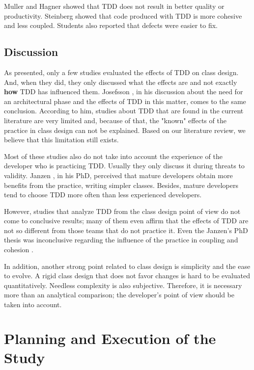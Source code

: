 \documentclass[times]{elsarticle}
\begin{document}
Muller and Hagner \cite{muller-e-hagner} showed that TDD does not result in
better quality or productivity. Steinberg \cite{steinberg} showed that
code produced with TDD is more cohesive and less coupled. Students also reported
that defects were easier to fix.

\subsection{Discussion}

As presented, only a few studies evaluated the effects of TDD on class design.
And, when they did, they only discussed what the effects are and not exactly
\textbf{how} TDD has influenced them. Josefsson \cite{josefsson}, in his discussion
about the need for an architectural phase and the effects of TDD in this matter,
comes to the same conclusion. According to him, studies about TDD that are
found in the current literature are very limited and, because of that, the
"known" effects of the practice in class design can not be explained. Based on
our literature review, we believe that this limitation still exists.

Most of these studies also do not take into account the experience
of the developer who is practicing TDD. Usually they only discuss it
during threats to validity. Janzen \cite{janzen-phd}, in his PhD, perceived
that mature developers obtain more benefits from the practice, writing simpler
classes. Besides, mature developers tend to choose TDD more often than
less experienced developers.

However, studies that analyze TDD from the class design point of view do not
come to conclusive results; many of them even affirm that the effects of TDD
are not so different from those teams that do not practice it. Even the Janzen's PhD
thesis was inconclusive regarding the influence of the practice in coupling
and cohesion \cite{janzen-phd}. 

In addition, another strong point related to class design is simplicity and
the ease to evolve. A rigid class design that does not favor changes is hard
to be evaluated quantitatively. Needless complexity is also subjective.
Therefore, it is necessary more than an analytical comparison; the
developer's point of view should be taken into account.

\section{Planning and Execution of the Study} 
\label{sec:planejamento}
\end{document}
